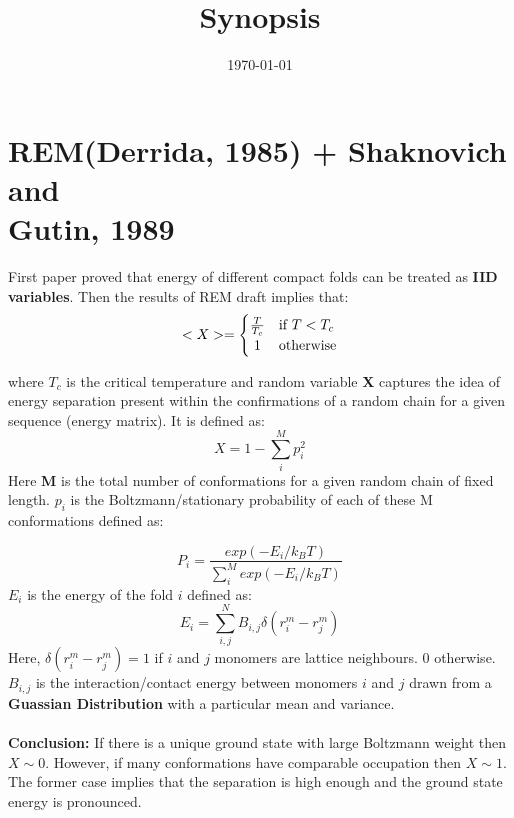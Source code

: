 \documentclass[12pt]{article}
\title{Synopsis}
\date{\today}
\theoremstyle{definition}
\theoremstyle{remark}
\begin{document}
\maketitle

\section{REM(Derrida, 1985) + Shaknovich and\\ Gutin, 1989}

First paper proved that energy of different compact folds can be treated as \textbf{IID variables}. Then the results of REM draft implies that:
\begin{equation}
<X> = \left\{\def\arraystretch{1.2}%
  \begin{array}{@{}c@{\quad}l@{}}
    \frac{T}{T_c} & \text{if $T<T_c$}\\
    1 & \text{otherwise}\\
  \end{array}\right.
\end{equation}

where $T_c$ is the critical temperature and random variable \textbf{X} captures the idea of energy separation present within the confirmations of a random chain for a given sequence (energy matrix). It is defined as:
\begin{equation}
	X = 1 - \sum_i^M p_i^2
\end{equation}
Here \textbf{M} is the total number of conformations for a given random chain of fixed length. \textbf{$p_i$} is the Boltzmann/stationary probability of each of these M conformations defined as: 

\begin{equation}
	P_i = \frac{exp(-E_i/k_B T)}{\sum\limits_i^M exp(-E_i/k_B T)}
\end{equation}
$E_i$ is the energy of the fold $i$ defined as:
\begin{equation}
	E_i = \sum_{i,j}^N B_{i,j} \delta (r_i^m - r_j^m)
\end{equation}
Here, $\delta (r_i^m - r_j^m) = 1$  if $i$ and $j$ monomers are lattice neighbours. $0$ otherwise.\\
$B_{i,j}$ is the interaction/contact energy between monomers $i$ and $j$ drawn from a \textbf{Guassian Distribution} with a particular mean and variance.
\\\\
\textbf{Conclusion:} If there is a unique ground state with large Boltzmann weight then $X\sim0$. However, if many conformations have comparable occupation then $X\sim1$. The former case implies that the separation is high enough and the ground state energy is pronounced.
\end{document}
